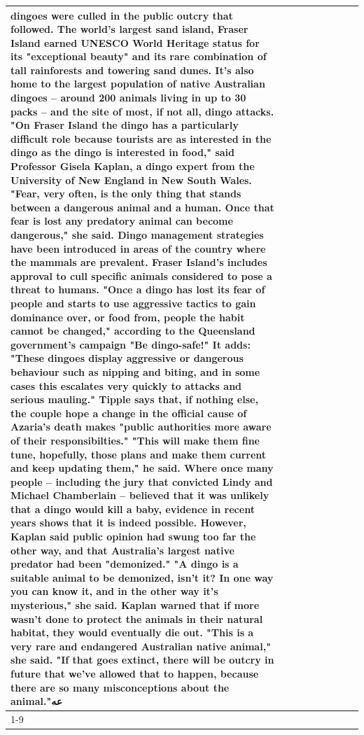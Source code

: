\begin{table}[H]
\begin{tabular}{lllrlllll}
dingoes were culled in the public outcry that followed. The world's largest sand island, Fraser Island earned UNESCO World Heritage status for its "exceptional beauty" and its rare combination of tall rainforests and towering sand dunes. It's also home to the largest population of native Australian dingoes -- around 200 animals living in up to 30 packs -- and the site of most, if not all, dingo attacks. "On Fraser Island the dingo has a particularly difficult role because tourists are as interested in the dingo as the dingo is interested in food," said Professor Gisela Kaplan, a dingo expert from the University of New England in New South Wales. "Fear, very often, is the only thing that stands between a dangerous animal and a human. Once that fear is lost any predatory animal can become dangerous," she said. Dingo management strategies have been introduced in areas of the country where the mammals are prevalent. Fraser Island's includes approval to cull specific animals considered to pose a threat to humans. "Once a dingo has lost its fear of people and starts to use aggressive tactics to gain dominance over, or food from, people the habit cannot be changed," according to the Queensland government's campaign "Be dingo-safe!" It adds: "These dingoes display aggressive or dangerous behaviour such as nipping and biting, and in some cases this escalates very quickly to attacks and serious mauling." Tipple says that, if nothing else, the couple hope a change in the official cause of Azaria's death makes "public authorities more aware of their responsibilties." "This will make them fine tune, hopefully, those plans and make them current and keep updating them," he said. Where once many people -- including the jury that convicted Lindy and Michael Chamberlain -- believed that it was unlikely that a dingo would kill a baby, evidence in recent years shows that it is indeed possible. However, Kaplan said public opinion had swung too far the other way, and that Australia's largest native predator had been "demonized." "A dingo is a suitable animal to be demonized, isn't it? In one way you can know it, and in the other way it's mysterious," she said. Kaplan warned that if more wasn't done to protect the animals in their natural habitat, they would eventually die out. "This is a very rare and endangered Australian native animal," she said. "If that goes extinct, there will be outcry in future that we've allowed that to happen, because there are so many misconceptions about the animal."عه \\
\cline{1-9}

\end{tabular}
\end{table}

